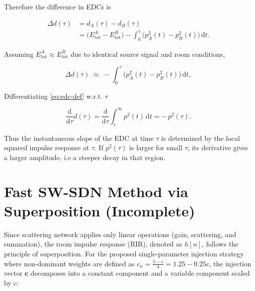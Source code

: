 \documentclass[conference]{IEEEtran}
\begin{document}
Therefore the difference in EDCs is

\begin{align}
\Delta d(\tau)
  &= d_A(\tau) - d_B(\tau)
\\
  &= \bigl(E_{\mathrm{tot}}^{A} - E_{\mathrm{tot}}^{B}\bigr)
     - \int_0^{\tau}
         \bigl(p_A^2(t) - p_B^2(t)\bigr)\,\mathrm dt.
\label{eq:Delta-d-def}
\end{align}

Assuming $E_{\mathrm{tot}}^{A} \approx E_{\mathrm{tot}}^{B}$ due to identical source signal and room conditions,

\begin{equation}
\Delta d(\tau)
  \;\approx\;
  - \int_0^{\tau}
      \bigl(p_A^2(t) - p_B^2(t)\bigr)\,\mathrm dt,
\label{eq:Delta-d-approx}
\end{equation}

Differentiating \eqref{eq:edc-def} w.r.t. $\tau$

\begin{equation}
\frac{\mathrm d}{\mathrm d\tau} d(\tau)
  = \frac{\mathrm d}{\mathrm d\tau}
    \int_{\tau}^{\infty} p^2(t)\,\mathrm dt
  = -\,p^2(\tau).
\label{eq:edc-derivative}
\end{equation}

Thus the instantaneous slope of the EDC at time $\tau$ is determined by the local squared impulse response at
$\tau$. If $p^2(\tau)$ is larger for small $\tau$, its derivative gives a larger amplitude, i.e a steeper decay in that region.



\newpage

\section{Fast SW-SDN Method via Superposition (Incomplete)}
\label{sec:fast}

Since scattering network applies only linear operations (gain, scattering, and summation), the room impulse response (RIR), denoted as $h[n]$, follows the principle of superposition. For the proposed single-parameter injection strategy where non-dominant weights are defined as $c_n = \frac{5-c}{4} = 1.25 - 0.25c$, the injection vector $\mathbf{c}$ decomposes into a constant component and a variable component scaled by $c$:
\end{document}
